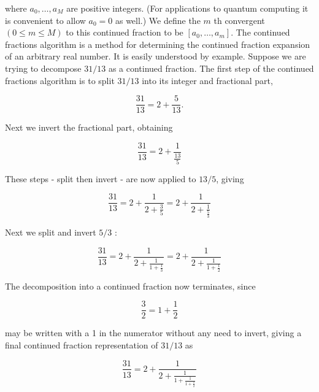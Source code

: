 where $a_{0}, \ldots, a_{M}$ are positive integers. (For applications to quantum computing it is convenient to allow $a_{0}=0$ as well.) We define the $m$ th convergent $(0 \leq m \leq M)$ to this continued fraction to be $\left[a_{0}, \ldots, a_{m}\right]$. The continued fractions algorithm is a method for determining the continued fraction expansion of an arbitrary real number. It is easily understood by example. Suppose we are trying to decompose $31 / 13$ as a continued fraction. The first step of the continued fractions algorithm is to split $31 / 13$ into its integer and fractional part,

\begin{equation}
    \frac{31}{13}=2+\frac{5}{13} . \tag{5.50}
\end{equation}

Next we invert the fractional part, obtaining

\begin{equation}
    \frac{31}{13}=2+\frac{1}{\frac{13}{5}} \tag{5.51}
\end{equation}

These steps - split then invert - are now applied to $13 / 5$, giving

\begin{equation}
    \frac{31}{13}=2+\frac{1}{2+\frac{3}{5}}=2+\frac{1}{2+\frac{1}{\frac{5}{3}}} \tag{5.52}
\end{equation}

Next we split and invert $5 / 3$ :

\begin{equation}
    \frac{31}{13}=2+\frac{1}{2+\frac{1}{1+\frac{1}{3}}}=2+\frac{1}{2+\frac{1}{1+\frac{1}{2}}} \tag{5.53}
\end{equation}

The decomposition into a continued fraction now terminates, since

\begin{equation}
    \frac{3}{2}=1+\frac{1}{2} \tag{5.54}
\end{equation}

may be written with a 1 in the numerator without any need to invert, giving a final continued fraction representation of $31 / 13$ as

\begin{equation}
    \frac{31}{13}=2+\frac{1}{2+\frac{1}{1+\frac{1}{1+\frac{1}{2}}}} \tag{5.55}
\end{equation}

